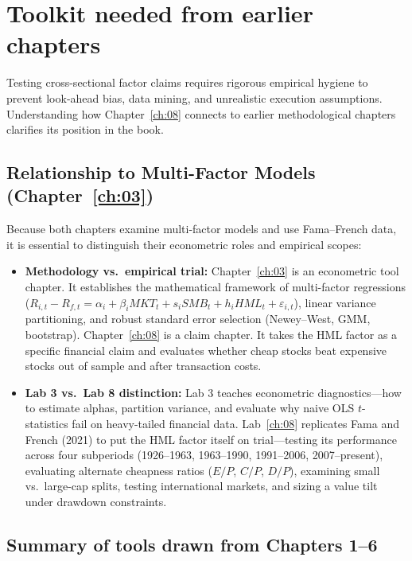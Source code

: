 \section{Toolkit needed from earlier chapters}
\label{sec:08-connection}

Testing cross-sectional factor claims requires rigorous empirical hygiene to prevent look-ahead bias, data mining, and unrealistic execution assumptions. Understanding how Chapter~\ref{ch:08} connects to earlier methodological chapters clarifies its position in the book.

\subsection{Relationship to Multi-Factor Models (Chapter~\ref{ch:03})}

Because both chapters examine multi-factor models and use Fama--French data, it is essential to distinguish their econometric roles and empirical scopes:

\begin{itemize}
  \item \textbf{Methodology vs.\ empirical trial:} Chapter~\ref{ch:03} is an econometric tool chapter. It establishes the mathematical framework of multi-factor regressions ($R_{i,t} - R_{f,t} = \alpha_i + \beta_i MKT_t + s_i SMB_t + h_i HML_t + \varepsilon_{i,t}$), linear variance partitioning, and robust standard error selection (Newey--West, GMM, bootstrap). Chapter~\ref{ch:08} is a claim chapter. It takes the HML factor as a specific financial claim and evaluates whether cheap stocks beat expensive stocks out of sample and after transaction costs.
  \item \textbf{Lab 3 vs.\ Lab 8 distinction:} Lab 3 teaches econometric diagnostics—how to estimate alphas, partition variance, and evaluate why naive OLS $t$-statistics fail on heavy-tailed financial data. Lab~\ref{ch:08} replicates Fama and French (2021) to put the HML factor itself on trial—testing its performance across four subperiods (1926--1963, 1963--1990, 1991--2006, 2007--present), evaluating alternate cheapness ratios ($E/P$, $C/P$, $D/P$), examining small vs.\ large-cap splits, testing international markets, and sizing a value tilt under drawdown constraints.
\end{itemize}

\subsection{Summary of tools drawn from Chapters 1--6}

